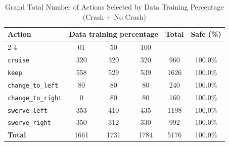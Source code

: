 \documentclass{article}
\begin{document}
\begin{table}[h]
\centering
\caption{Grand Total Number of Actions Selected by Data Training Percentage (Crash + No Crash)}
\begin{tabular}{l|ccc|c|c}
\toprule
\multirow{2}{*}{Action} & \multicolumn{3}{c|}{Data training percentage} & \multirow{2}{*}{Total} & \multirow{2}{*}{Safe (\%)} \\
\cmidrule{2-4}
 & 01 & 50 & 100 & & \\
\midrule
\texttt{cruise} & 320 & 320 & 320 & 960 & 100.0\% \\ 
\texttt{keep} & 558 & 529 & 539 & 1626 & 100.0\% \\ 
\texttt{change\_to\_left} & 80 & 80 & 80 & 240 & 100.0\% \\ 
\texttt{change\_to\_right} & 0 & 80 & 80 & 160 & 100.0\% \\ 
\texttt{swerve\_left} & 353 & 410 & 435 & 1198 & 100.0\% \\ 
\texttt{swerve\_right} & 350 & 312 & 330 & 992 & 100.0\% \\ 
\midrule
\textbf{Total} & 1661 & 1731 & 1784 & 5176 & 100.0\% \\ 
\bottomrule
\end{tabular}
\end{table}
\end{document}
